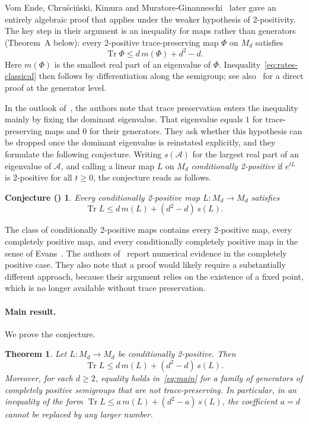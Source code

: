 \documentclass[11pt,a4paper]{article}
\theoremstyle{plain}
\newtheorem{theorem}{Theorem}
\newtheorem*{conjecture}{Conjecture {\normalfont(\cite[Sec.~3, Eq.~(10)]{vEC+26})}}
\theoremstyle{definition}
\theoremstyle{remark}
\numberwithin{equation}{section}
\newcommand{\M}{M_d}
\newcommand{\Tr}{\operatorname{Tr}}
\newcommand{\mmin}{m}
\newcommand{\smax}{s}
\newcommand{\cA}{\mathcal{A}}
\begin{document}
Vom Ende, Chru\'sci\'nski, Kimura and Muratore-Ginanneschi~\cite{vEC+26} later
gave an entirely algebraic proof that applies under the weaker hypothesis of
2-positivity. The key step in their argument is an inequality for maps rather than
generators (Theorem~A below): every 2-positive trace-preserving map $\Phi$
on $\M$ satisfies
\begin{equation}\label{eq:vEC-intro}
  \Tr\Phi\le d\,\mmin(\Phi)+d^2-d .
\end{equation}
Here $\mmin(\Phi)$ is the smallest real part of an eigenvalue of $\Phi$.
Inequality~\eqref{eq:rates-classical} then follows by differentiation along the
semigroup; see also~\cite{CvEKM25} for a direct proof at the generator level.

In the outlook of~\cite{vEC+26}, the authors note that trace preservation
enters the inequality mainly by fixing the dominant eigenvalue. That eigenvalue
equals $1$ for trace-preserving maps and $0$ for their generators. They ask
whether this hypothesis can be dropped once the dominant eigenvalue is
reinstated explicitly, and they formulate the following conjecture. Writing
$\smax(\cA)$ for the largest real part of an eigenvalue of $\cA$, and
calling a linear map $L$ on $\M$ \emph{conditionally 2-positive} if $e^{tL}$ is
2-positive for all $t\ge0$, the conjecture reads as follows.

\begin{conjecture}
Every conditionally 2-positive map $L\colon\M\to\M$ satisfies
\[
  \Tr L\le d\,\mmin(L)+(d^2-d)\,\smax(L).
\]
\end{conjecture}

The class of conditionally 2-positive maps contains every 2-positive map, every
completely positive map, and every conditionally completely positive map in the
sense of Evans~\cite{Eva77,WECC08}. The authors of~\cite{vEC+26} report numerical evidence in the
completely positive case. They also note that a proof would likely require a
substantially different approach, because their argument relies on the
existence of a fixed point, which is no longer available without trace
preservation.

\paragraph{Main result.}
We prove the conjecture.

\begin{theorem}\label{thm:main}
Let $L\colon\M\to\M$ be conditionally 2-positive. Then
\begin{equation}\label{eq:main}
  \Tr L\le d\,\mmin(L)+(d^2-d)\,\smax(L).
\end{equation}
Moreover, for each $d\ge2$, equality holds in~\eqref{eq:main} for a family of
generators of completely positive semigroups that are not trace-preserving.
In particular, in an inequality of the form
$\Tr L\le a\,\mmin(L)+(d^2-a)\,\smax(L)$, the coefficient $a=d$ cannot be
replaced by any larger number.
\end{theorem}
\end{document}
